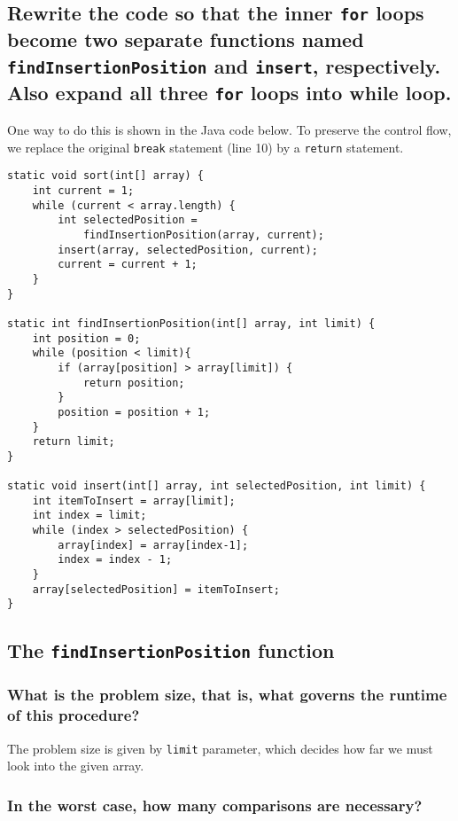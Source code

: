 \documentclass[11pt]{article}
\begin{document}
\subsection{Rewrite the code so that the inner \texttt{for} loops become two separate functions named \texttt{findInsertionPosition} and \texttt{insert}, respectively. Also expand all three \texttt{for} loops into while loop.}
\label{sec:org267c9fe}

One way to do this is shown in the Java code below. To preserve
the control flow, we replace the original \texttt{break} statement (line
10) by a \texttt{return} statement.

\begin{verbatim}
static void sort(int[] array) {
    int current = 1;
    while (current < array.length) {
        int selectedPosition =
            findInsertionPosition(array, current);
        insert(array, selectedPosition, current);
        current = current + 1;
    }
}

static int findInsertionPosition(int[] array, int limit) {
    int position = 0;
    while (position < limit){
        if (array[position] > array[limit]) {
            return position;
        }
        position = position + 1;
    }
    return limit;
}

static void insert(int[] array, int selectedPosition, int limit) {
    int itemToInsert = array[limit];
    int index = limit;
    while (index > selectedPosition) {
        array[index] = array[index-1];
        index = index - 1;
    }
    array[selectedPosition] = itemToInsert;
}
\end{verbatim}

\subsection{The \texttt{findInsertionPosition} function}
\label{sec:org14b1db3}

\subsubsection{What is the problem size, that is, what governs the runtime of this procedure?}
\label{sec:org2f795a7}

The problem size is given by \texttt{limit} parameter, which decides
how far we must look into the given array.

\subsubsection{In the worst case, how many comparisons are necessary?}
\label{sec:org211749d}
\end{document}
